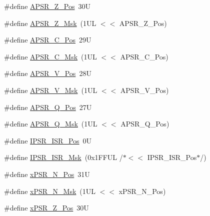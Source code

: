 \begin{DoxyCompactItemize}
\item 
\#define \mbox{\hyperlink{group___c_m_s_i_s___c_o_r_e_ga3661286d108b1aca308d7445685eae3a}{A\+P\+S\+R\+\_\+\+Z\+\_\+\+Pos}}~30U
\item 
\#define \mbox{\hyperlink{group___c_m_s_i_s___c_o_r_e_ga1deb4d1aa72bb83d1f79329406f15711}{A\+P\+S\+R\+\_\+\+Z\+\_\+\+Msk}}~(1\+U\+L $<$$<$ A\+P\+S\+R\+\_\+\+Z\+\_\+\+Pos)
\item 
\#define \mbox{\hyperlink{group___c_m_s_i_s___c_o_r_e_ga6cf72aa6f09a168f9e5beda1a4a887b9}{A\+P\+S\+R\+\_\+\+C\+\_\+\+Pos}}~29U
\item 
\#define \mbox{\hyperlink{group___c_m_s_i_s___c_o_r_e_ga6d47803fbad455bc10bd1ce59f2f335d}{A\+P\+S\+R\+\_\+\+C\+\_\+\+Msk}}~(1\+U\+L $<$$<$ A\+P\+S\+R\+\_\+\+C\+\_\+\+Pos)
\item 
\#define \mbox{\hyperlink{group___c_m_s_i_s___c_o_r_e_gac62830f67679ccd11658c4172c3e6ea7}{A\+P\+S\+R\+\_\+\+V\+\_\+\+Pos}}~28U
\item 
\#define \mbox{\hyperlink{group___c_m_s_i_s___c_o_r_e_ga33305d6701356bff6890b315fe8b5489}{A\+P\+S\+R\+\_\+\+V\+\_\+\+Msk}}~(1\+U\+L $<$$<$ A\+P\+S\+R\+\_\+\+V\+\_\+\+Pos)
\item 
\#define \mbox{\hyperlink{group___c_m_s_i_s___c_o_r_e_ga298749e176f12827328bb7b92a6b2411}{A\+P\+S\+R\+\_\+\+Q\+\_\+\+Pos}}~27U
\item 
\#define \mbox{\hyperlink{group___c_m_s_i_s___c_o_r_e_ga90ffd4ec4149c2f5dd7747c1533fb002}{A\+P\+S\+R\+\_\+\+Q\+\_\+\+Msk}}~(1\+U\+L $<$$<$ A\+P\+S\+R\+\_\+\+Q\+\_\+\+Pos)
\item 
\#define \mbox{\hyperlink{group___c_m_s_i_s___c_o_r_e_ga0e34027584d02c43811ae908a5ca9adf}{I\+P\+S\+R\+\_\+\+I\+S\+R\+\_\+\+Pos}}~0U
\item 
\#define \mbox{\hyperlink{group___c_m_s_i_s___c_o_r_e_gaf013a4579a64d1f21f56ea9f1b33ab56}{I\+P\+S\+R\+\_\+\+I\+S\+R\+\_\+\+Msk}}~(0x1\+F\+F\+U\+L /$\ast$$<$$<$ I\+P\+S\+R\+\_\+\+I\+S\+R\+\_\+\+Pos$\ast$/)
\item 
\#define \mbox{\hyperlink{group___c_m_s_i_s___c_o_r_e_ga031eb1b8ebcdb3d602d0b9f2ec82a7ae}{x\+P\+S\+R\+\_\+\+N\+\_\+\+Pos}}~31U
\item 
\#define \mbox{\hyperlink{group___c_m_s_i_s___c_o_r_e_gaf600f4ff41b62cf2f3b0a59b6d2e93d6}{x\+P\+S\+R\+\_\+\+N\+\_\+\+Msk}}~(1\+U\+L $<$$<$ x\+P\+S\+R\+\_\+\+N\+\_\+\+Pos)
\item 
\#define \mbox{\hyperlink{group___c_m_s_i_s___c_o_r_e_ga5869dd608eea73c80f0567d781d2230b}{x\+P\+S\+R\+\_\+\+Z\+\_\+\+Pos}}~30U
\item 
$$
\end{DoxyCompactItemize}

